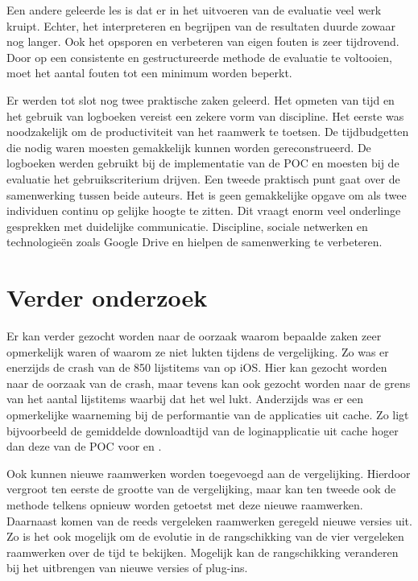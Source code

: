 Een andere geleerde les is dat er in het uitvoeren van de evaluatie veel werk kruipt.
Echter, het interpreteren en begrijpen van de resultaten duurde zowaar nog langer.
Ook het opsporen en verbeteren van eigen fouten is zeer tijdrovend.
Door op een consistente en gestructureerde methode de evaluatie te voltooien, moet het aantal fouten tot een minimum worden beperkt.

Er werden tot slot nog twee praktische zaken geleerd.
Het opmeten van tijd en het gebruik van logboeken vereist een zekere vorm van discipline.
Het eerste was noodzakelijk om de productiviteit van het raamwerk te toetsen.
De tijdbudgetten die nodig waren moesten gemakkelijk kunnen worden gereconstrueerd.
De logboeken werden gebruikt bij de implementatie van de POC en moesten bij de evaluatie het gebruikscriterium drijven.
Een tweede praktisch punt gaat over de samenwerking tussen beide auteurs.
Het is geen gemakkelijke opgave om als twee individuen continu op gelijke hoogte te zitten.
Dit vraagt enorm veel onderlinge gesprekken met duidelijke communicatie.
Discipline, sociale netwerken en technologieën zoals Google Drive en \gh{} hielpen de samenwerking te verbeteren.

\section{Verder onderzoek} %
Er kan verder gezocht worden naar de oorzaak waarom bepaalde zaken zeer opmerkelijk waren of waarom ze niet lukten tijdens de vergelijking.
Zo was er enerzijds de crash van de 850 lijstitems van \kendo{} op iOS.
Hier kan gezocht worden naar de oorzaak van de crash, maar tevens kan ook gezocht worden naar de grens van het aantal lijstitems waarbij dat het wel lukt.
Anderzijds was er een opmerkelijke waarneming bij de performantie van de applicaties uit cache. 
Zo ligt bijvoorbeeld de gemiddelde downloadtijd van de loginapplicatie uit cache hoger dan deze van de POC voor \jqm{} en \lungo{}. 

Ook kunnen nieuwe raamwerken worden toegevoegd aan de vergelijking.
Hierdoor vergroot ten eerste de grootte van de vergelijking, maar kan ten tweede ook de methode telkens opnieuw worden getoetst met deze nieuwe raamwerken.
Daarnaast komen van de reeds vergeleken raamwerken geregeld nieuwe versies uit.
Zo is het ook mogelijk om de evolutie in de rangschikking van de vier vergeleken raamwerken over de tijd te bekijken.
Mogelijk kan de rangschikking veranderen bij het uitbrengen van nieuwe versies of plug-ins.

